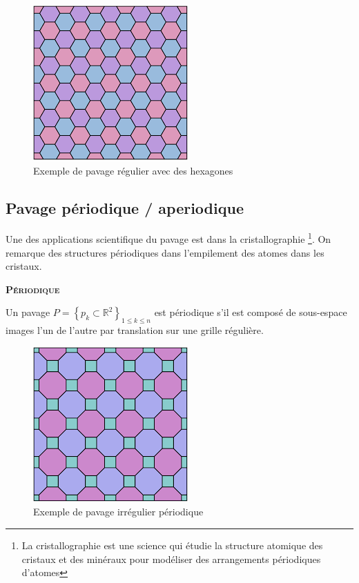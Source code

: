 \documentclass{article}
\begin{document}
\begin{figure} [h]
    \center
    \includegraphics [scale=0.5] {image/pavage_hexagonal.png}
    \caption{Exemple de pavage régulier avec des hexagones}
\end{figure}



\newpage

\subsection{Pavage périodique / aperiodique}

Une des applications scientifique du pavage est dans la cristallographie \footnote{La cristallographie est une science qui étudie la structure atomique des cristaux et des minéraux pour modéliser des arrangements périodiques d'atomes}. On remarque des structures périodiques dans l'empilement des atomes dans les cristaux.

\hspace{1.5cm}

\textbf{\textsc{Périodique}}

Un pavage $P=\left \{ p_{k}\subset \mathbb{R}^{2} \right \}_{1\leq k\leq n}$ est périodique s'il est composé de sous-espace images l'un de l'autre par translation sur une grille régulière.

\begin{figure} [h]
    \center
    \includegraphics [scale=0.3] {image/pavage_périodique_irrégulier.png}
    \caption{Exemple de pavage irrégulier périodique}
\end{figure}
\end{document}
